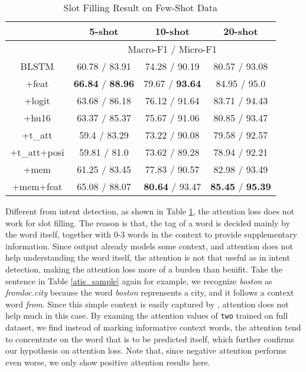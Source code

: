 \begin{table}
\setlength{\tabcolsep}{0.23em}
\centering
\small{
\begin{tabular}{|c|c|c|c|}

\hline
  & \multicolumn{1}{|c|}{5-shot} & \multicolumn{1}{|c|}{10-shot} & \multicolumn{1}{|c|}{20-shot}  \\
 \hline
  &  \multicolumn{3}{|c|}{Macro-F1 / Micro-F1}   \\
\hline
BLSTM & 60.78 / 83.91 & 74.28  / 90.19 & 80.57 / 93.08 \\
\hline
+feat & \textbf{66.84} / \textbf{88.96} & 79.67 / \textbf{93.64} & 84.95 / 95.0 \\
\hline
+logit & 63.68 / 86.18 & 76.12 / 91.64  & 83.71 / 94.43 \\
\hline
+hu16 & 63.37 / 85.37 & 75.67 / 91.06 & 80.85 / 93.47 \\
\hline
+t\_att & 59.4 / 83.29 & 73.22 / 90.08 & 79.58 / 92.57 \\
\hline
+t\_att+posi & 59.81 / 81.0 & 73.62 / 89.28 & 78.94 / 92.21 \\
\hline
+mem & 61.25 / 83.45 & 77.83 / 90.57 & 82.98 / 93.49 \\
\hline
+mem+feat & 65.08 / 88.07 & \textbf{80.64} / 93.47 & \textbf{85.45} / \textbf{95.39} \\
\hline
\end{tabular}
}
\caption{Slot Filling Result on Few-Shot Data}
\label{tab_slot_few}
\end{table}

Different from intent detection, as shown in Table \ref{tab_slot_few}, the attention loss does not work for slot filling.
The reason is that, the tag of a word is decided mainly by the word itself, together with 0-3 words in the context to provide supplementary information.
Since \BLSTM output already models some context, and attention does not help understanding the word itself, the attention is not that useful as in intent detection, making the attention loss more of a burden than benifit.
Take the sentence in Table \ref{atis_sample} again for example, we recognize \emph{boston} as \emph{fromloc.city} because the word \emph{boston} reprensents a city, and it follows a context word \emph{from}. Since this simple context is easily captured by \BLSTM, attention does not help much in this case.
By examing the attention values of \texttt{two} trained on full dataset,
we find instead of marking informative context words, the attention tend to concentrate on the word that is to be predicted itself, which further confirms our hypothesis on attention loss. 
Note that, since negative attention performs even worse, we only show positive attention results here.

